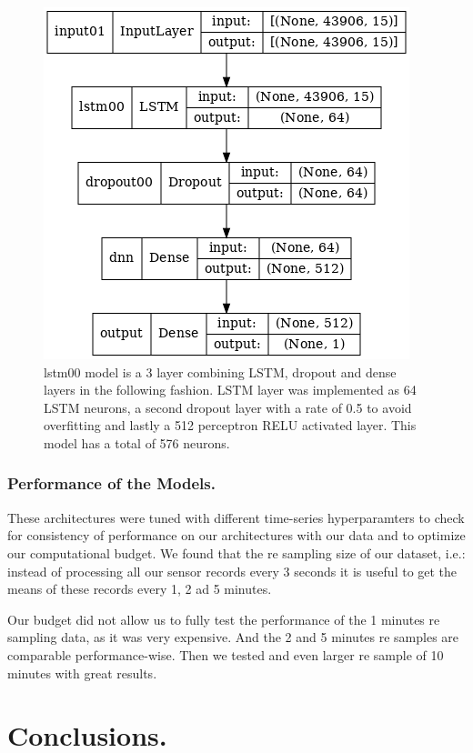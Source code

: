 \documentclass{llncs}
\begin{document}
\begin{figure}
    \centering
    \includegraphics[scale=0.45]{image02.png}
    \caption{lstm00 model is a 3 layer combining LSTM, dropout and dense layers in the following fashion. LSTM layer was implemented as 64 LSTM neurons, a second dropout layer with a rate of 0.5 to avoid overfitting and lastly a 512 perceptron RELU activated layer. This model has a total of 576 neurons. }
    \label{fig2}
\end{figure}


    \hypertarget{performance-of-the-models.}{%
\subsubsection{Performance of the
Models.}\label{performance-of-the-models.}}

These architectures were tuned with different time-series hyperparamters
to check for consistency of performance on our architectures with our
data and to optimize our computational budget. We found that the
re sampling size of our dataset, i.e.: instead of processing all our
sensor records every 3 seconds it is useful to get the means of these
records every 1, 2 ad 5 minutes. 


    Our budget did not allow us to fully test the performance of the 1 minutes
re sampling data, as it was very expensive. And the 2 and 5 minutes re samples
are comparable performance-wise. Then we tested and even larger re sample
of 10 minutes with great results.


    \hypertarget{conclusions}{%
    \section{Conclusions.}\label{conclusions}}
\end{document}
